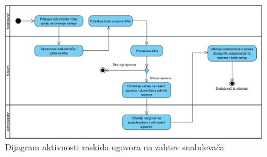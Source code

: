 \begin{figure}[H]
\begin{center}
\includegraphics[width=\textwidth]{Pictures/activity_supplier_contract_termination_1.png}
\end{center}
    \caption{Dijagram aktivnosti raskida ugovora na zahtev snabdevača}
\label{fig:ActivitySupplierContractTermination1}
\end{figure}


